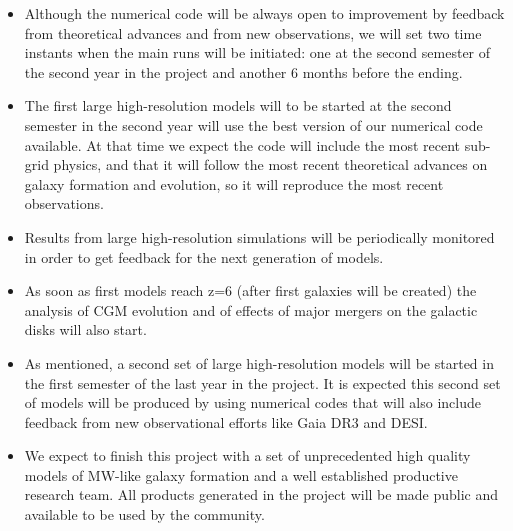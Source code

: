 \documentclass[oneside, a4paper, onecolumn, 11pt]{article}
\begin{document}
\begin{itemize}
    \item Although the numerical code will be always open to improvement by feedback from theoretical advances and from new observations, we will set two time instants when the main runs will be initiated: one at the second semester of the second year in the project and another 6 months before the ending.
    \item The first large high-resolution models will to be started at the second semester in the second year will use the best version of our numerical code available. At that time we expect the code will include the most recent sub-grid physics, and that it will follow the most recent theoretical advances on galaxy formation and evolution, so it will reproduce the most recent observations. 
    \item Results from large high-resolution simulations will be periodically monitored in order to get feedback for the next generation of models.
    \item As soon as first models reach z=6 (after first galaxies will be created) the analysis of CGM evolution and of effects of major mergers on the galactic disks will also start.
    \item As mentioned, a second set of large high-resolution models will be started in the first semester of the last year in the project. It is expected this second set of models will be produced by using numerical codes that will also include feedback from new observational efforts like Gaia DR3 and DESI.
    \item We expect to finish this project with a set of unprecedented high quality models of MW-like galaxy formation and a well established productive research team. All products generated in the project will be made public and available to be used by the community.
\end{itemize}

\\
\end{document}
